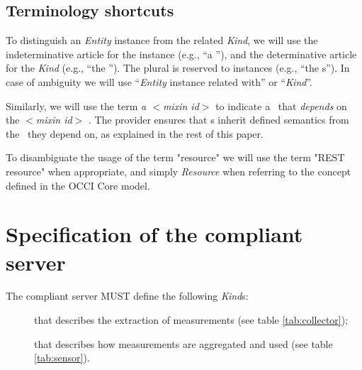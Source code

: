 \documentclass[10pt]{article}  %
\begin{document}
\subsection{Terminology shortcuts}

To distinguish an {\em Entity} instance from the related {\em Kind}, we will use the indeterminative article for the instance (e.g., ``a \rs''), and the determinative article for the {\em Kind} (e.g., ``the \rs''). The plural is reserved to instances (e.g., ``the \rs s''). In case of ambiguity we will use ``{\em Entity} instance related with'' or ``{\em Kind}''. 

Similarly, we will use the term {\em a $<$mixin id$>$ \mi} to indicate a \mi\ that {\em depends} on the {\em $<$mixin id$>$} \mi. The provider ensures that \mi s inherit defined semantics from the \mi\ they depend on, as explained in the rest of this paper. 

To disambiguate the usage of the term "resource" we will use the term "REST resource" when appropriate, and simply {\em Resource} when referring to the concept defined in the OCCI Core model.

\section{Specification of the compliant server}

The compliant server MUST define the following {\em Kind}s:

\begin{description}

\item [\coll] that describes the extraction of measurements (see table \ref{tab:collector});

\item [\sens] that describes how measurements are aggregated and used (see table  \ref{tab:sensor}).

\end{description}
 
\end{document}

